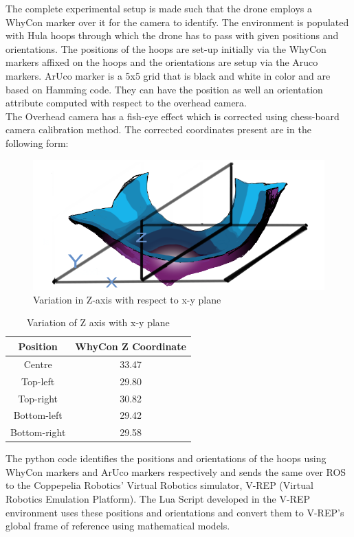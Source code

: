 The complete experimental setup is made such that the drone employs a WhyCon marker over it for the camera to identify. The environment is populated with Hula hoops through which the drone has to pass with given positions and orientations. The positions of the hoops are set-up initially via the WhyCon markers affixed on the hoops and the orientations are setup via the Aruco markers. ArUco marker is a 5x5 grid that is black and white in color and are based on Hamming code. They can have the position as well an orientation attribute computed with respect to the overhead camera.
\\
The Overhead camera has a fish-eye effect which is corrected using chess-board camera calibration method. The corrected coordinates present are in the following form:
\begin{figure}[H]
    \centering
    \includegraphics[scale=0.6]{SummerInterReport/project/Images-Major/varz.png}
    \caption{Variation in Z-axis with respect to x-y plane}
    \label{fig:varz}
\end{figure}
\begin{table}[H]
    \centering
    \begin{tabular}{|c|c|}
     \hline
     \textbf{Position} & \textbf{WhyCon Z Coordinate}  \\
     \hline
     Centre & 33.47\\
     Top-left & 29.80\\
     Top-right & 30.82\\
     Bottom-left & 29.42\\
     Bottom-right & 29.58\\
     \hline
    \end{tabular}
    \caption{Variation of Z axis with x-y plane}
    \label{tab:varz}
\end{table}

The python code identifies the positions and orientations of the hoops using WhyCon markers and ArUco markers respectively and sends the same over ROS to the Coppepelia Robotics' Virtual Robotics simulator, V-REP (Virtual Robotics Emulation Platform). The Lua Script developed in the V-REP environment uses these positions and orientations and convert them to V-REP's global frame of reference using mathematical models.\\

